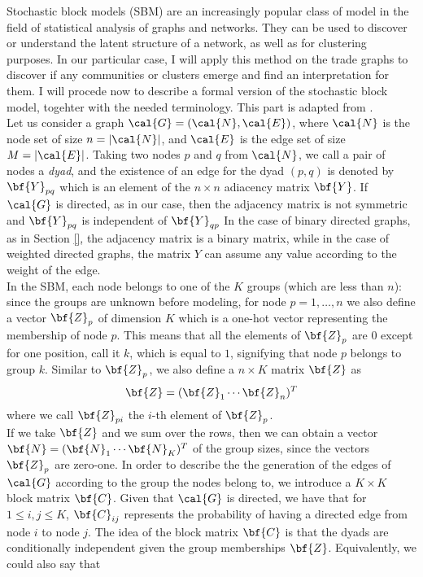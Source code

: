 Stochastic block models (SBM) are an increasingly popular class of model in the field of statistical analysis of graphs and networks. They can be used to discover or understand the latent structure of a network, as well as for clustering purposes. In our particular case, I will apply this method on the trade graphs to discover if any communities or clusters emerge and find an interpretation for them.
I will procede now to describe a formal version of the stochastic block model, togehter with the needed terminology. This part is adapted from \citeauthor{lee2019review}.\\
Let us consider a graph $\cal{G} = (\cal{N},\cal{E})$, where $\cal{N}$ is the node set of size $n = |\cal{N}|$, and $\cal{E}$ is the edge set of size $M = |\cal{E}|$. Taking two nodes $p$ and $q$ from $\cal{N}$, we call a pair of nodes a \textit{dyad}, and the existence of an edge for the dyad $(p,q)$ is denoted by $\bf{Y}_{pq}$ which is an element of the $n \times n$ adiacency matrix $\bf{Y}$. If $\cal{G}$ is directed, as in our case, then the adjacency matrix is not symmetric and $\bf{Y}_{pq}$ is independent of $\bf{Y}_{qp}$ In the case of binary directed graphs, as in Section \ref{}, the adjacency matrix is a binary matrix, while in the case of weighted directed graphs, the matrix $Y$ can assume any value according to the weight of the edge.\\
In the SBM, each node belongs to one of the $K$ groups (which are less than $n$): since the groups are unknown before modeling, for node $p = 1,\ldots,n$ we also define a vector $\bf{Z}_p$ of dimension $K$ which is a one-hot vector representing the membership of node $p$. This means that all the elements of $\bf{Z}_{p}$ are 0 except for one position, call it $k$, which is equal to $1$, signifying that node $p$ belongs to group $k$.
Similar to $\bf{Z}_{p}$, we also define a $n \times K$ matrix $\bf{Z}$ as
\[
    \bf{Z} = (\bf{Z}_1 \cdots \bf{Z}_n)^T
\]
where we call $\bf{Z}_{pi}$ the $i$-th element of $\bf{Z}_p$.\\
If we take $\bf{Z}$ and we sum over the rows, then we can obtain a vector $\bf{N} = (\bf{N}_1\cdots\bf{N}_K)^T$ of the group sizes, since the vectors $\bf{Z}_{p}$ are zero-one.
In order to describe the the generation of the edges of $\cal{G}$ according to the group the nodes belong to, we introduce a $K \times K$ block matrix $\bf{C}$. Given that $\cal{G}$ is directed, we have that for $1 \leq i,j \leq K$, $\bf{C}_{ij}$ represents the probability of having a directed edge from node $i$ to node $j$. The idea of the block matrix $\bf{C}$ is that the dyads are conditionally independent given the group memberships $\bf{Z}$. Equivalently, we could also say that
